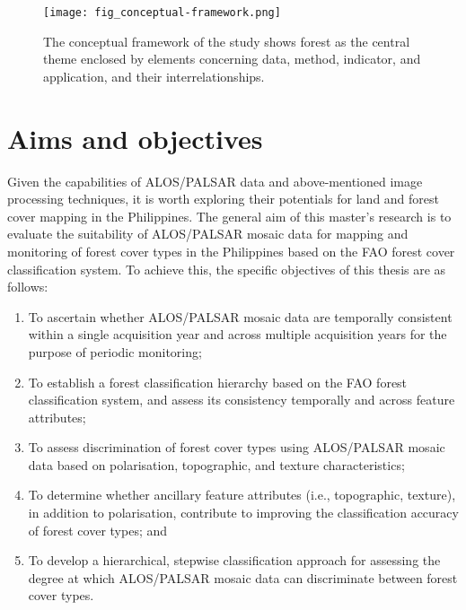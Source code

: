 \begin{figure}
	\centering
	\texttt{[image: fig\_conceptual-framework.png]}
	\caption[The conceptual framework of the study shows forest as the central theme enclosed by elements concerning data, method, indicator, and application, and their interrelationships.]{The conceptual framework of the study shows forest as the central theme enclosed by elements concerning data, method, indicator, and application, and their interrelationships.}
	\label{fig: litrev-fig2.5}
\end{figure}

\section{Aims and objectives}
\label{sec: litrev-aims-objectives}

Given the capabilities of ALOS/PALSAR data and above-mentioned image processing techniques, it is worth exploring their potentials for land and forest cover mapping in the Philippines. The general aim of this master’s research is to evaluate the suitability of ALOS/PALSAR mosaic data for mapping and monitoring of forest cover types in the Philippines based on the FAO forest cover classification system. To achieve this, the specific objectives of this thesis are as follows:

\begin{enumerate}
	\item To ascertain whether ALOS/PALSAR mosaic data are temporally consistent within a single acquisition year and across multiple acquisition years for the purpose of periodic monitoring;
	\item To establish a forest classification hierarchy based on the FAO forest classification system, and assess its consistency temporally and across feature attributes;
	\item To assess discrimination of forest cover types using ALOS/PALSAR mosaic data based on polarisation, topographic, and texture characteristics;
	\item To determine whether ancillary feature attributes (i.e., topographic, texture), in addition to polarisation, contribute to improving the classification accuracy of forest cover types; and
	\item To develop a hierarchical, stepwise classification approach for assessing the degree at which ALOS/PALSAR mosaic data can discriminate between forest cover types.
\end{enumerate}

